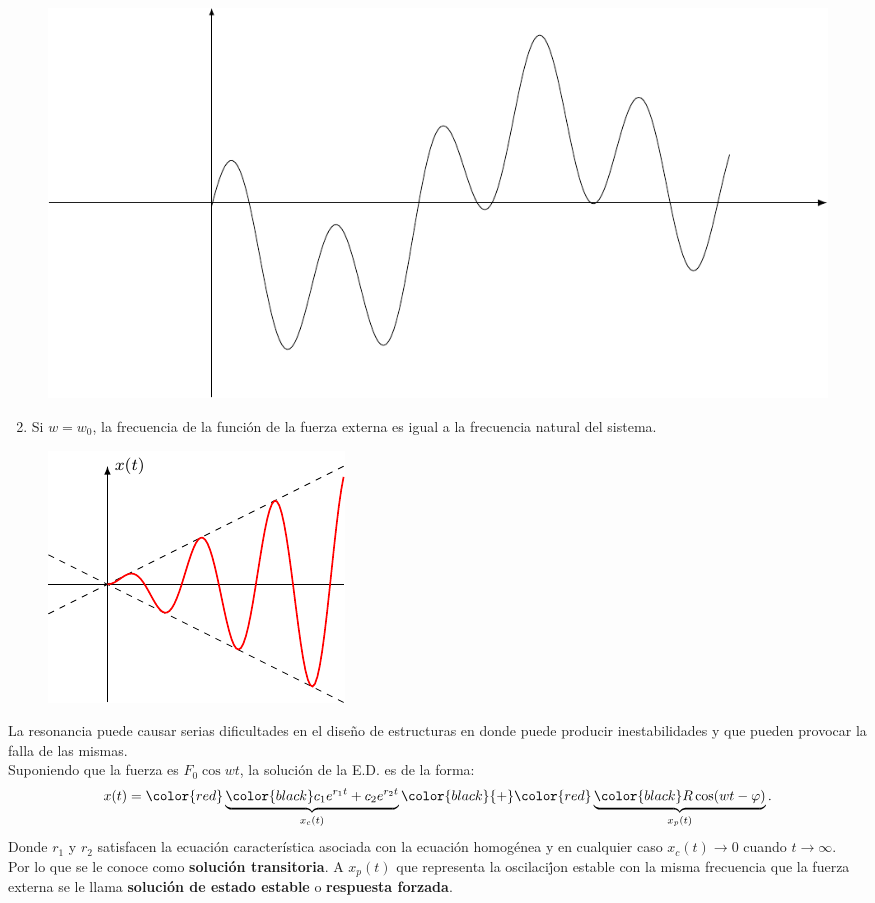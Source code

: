 \documentclass{beamer}
\begin{document}
\begin{frame}[t]
	\begin{block}{}
		\color{red}{Pulsasiones:} \vspace{-5mm}
		\begin{figure}[hbtp!]
			\centering
			\includegraphics[width= 0.5 \linewidth]{IMAGENES/7/tikz.pdf}
		\end{figure}
		\begin{enumerate}
			\setcounter{enumi}{1}
			\item Si \(w=w_0\), la frecuencia de la función de la fuerza externa es igual a la frecuencia natural del sistema.
		\end{enumerate}
		\begin{figure}[hbtp!]
			\centering
			\includegraphics[width= 0.4 \linewidth]{IMAGENES/8/tikz.pdf}
		\end{figure}
	\end{block}
\end{frame}

\begin{frame}[t]
	\begin{block}{}
		La resonancia puede causar serias dificultades en el diseño de estructuras en donde puede producir inestabilidades y que pueden provocar la falla de las mismas. \\[2mm]
		Suponiendo que la fuerza es \(F_0 \cos wt\), la solución de la E.D. es de la forma:
		\[
			x(t) = \color{red} \underbrace{\color{black} c_1e^{r_1t} + c_2e^{r_2 t}} _{x_c(t)} \color{black}{+} \color{red} \underbrace{\color{black} R \cos (wt- \varphi)} _{x_p(t)}.
		\]
		Donde \(r_1\) y \(r_2\) satisfacen la ecuación característica asociada con la ecuación homogénea y en cualquier caso \(x_c(t) \longrightarrow 0\) cuando \(t \longrightarrow \infty\). \\[2mm]
		Por lo que se le conoce como \textbf{solución transitoria}. A \(x_p(t )\) que representa la oscilacij́on estable con la misma frecuencia que la fuerza externa se le llama \textbf{solución de estado estable} o \textbf{respuesta forzada}. 
	\end{block}
\end{frame}
\end{document}
